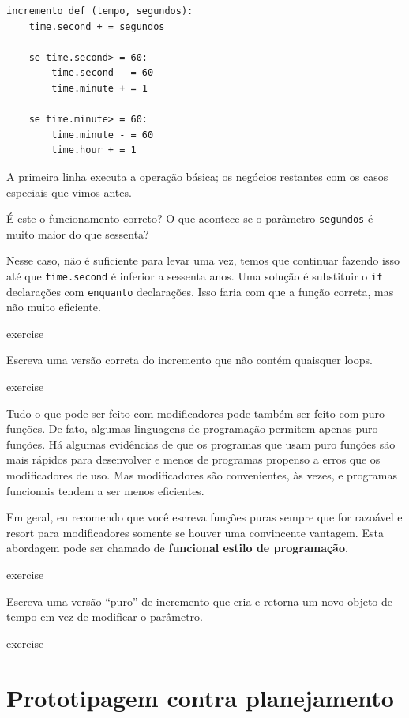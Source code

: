 \documentclass[10pt]{book}
\begin{document}
\begin{exercise}
\begin{v erbatim}
{\begin{verbatim}
incremento def (tempo, segundos):
    time.second + = segundos

    se time.second> = 60:
        time.second - = 60
        time.minute + = 1

    se time.minute> = 60:
        time.minute - = 60
        time.hour + = 1
\end{verbatim}
%
A primeira linha executa a operação básica; os negócios restantes
com os casos especiais que vimos antes.

É este o funcionamento correto? O que acontece se o parâmetro {\tt segundos}
é muito maior do que sessenta?  

Nesse caso, não é suficiente para levar
uma vez, temos que continuar fazendo isso até que {\tt time.second} é inferior a sessenta anos.
Uma solução é substituir o {\tt if} declarações com {\tt enquanto}
declarações. Isso faria com que a função correta, mas não
muito eficiente.

\begin{} exercise

Escreva uma versão correta do incremento {\tt} que
não contém quaisquer loops.

\end{} exercise

Tudo o que pode ser feito com modificadores pode também ser feito com puro
funções. De fato, algumas linguagens de programação permitem apenas puro
funções. Há algumas evidências de que os programas que usam puro
funções são mais rápidos para desenvolver e menos de programas propenso a erros
que os modificadores de uso. Mas modificadores são convenientes, às vezes,
e programas funcionais tendem a ser menos eficientes.

Em geral, eu recomendo que você escreva funções puras sempre que for
razoável e resort para modificadores somente se houver uma convincente
vantagem. Esta abordagem pode ser chamado de {\bf funcional
estilo de programação}.


\begin{} exercise

Escreva uma versão ``puro'' de {incremento \tt} que cria e retorna
um novo objeto de tempo em vez de modificar o parâmetro.

\end{} exercise


\section{Prototipagem contra planejamento}
\label{protótipo}

}
\end{v erbatim}
\end{exercise}
\end{document}
